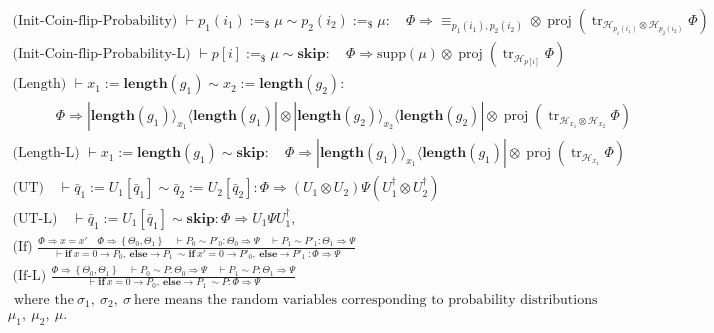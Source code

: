 \documentclass{report}
\theoremstyle{defn_style}
\begin{document}

$\begin{aligned}
& \text{ ({Init-Coin-flip-Probability}) } {\vdash {p_1(i_1):=_\$\mu \sim p_2(i_2):=_\$\mu:\quad \Phi \Longrightarrow \equiv_{p_1(i_1),p_2(i_2)}\otimes\operatorname{proj}\left(\operatorname{tr}_{\mathcal{H}_{p_1(i_1)} \otimes \mathcal{H}_{p_2(i_2)}}\Phi\right)}} \\ 
& \text{ ({Init-Coin-flip-Probability-L}) } {\vdash p[i]:=_\$\mu \sim \textbf{skip}:\quad \Phi \Longrightarrow \text{supp}(\mu)\otimes\operatorname{proj}\left(\operatorname{tr}_{\mathcal{H}_{p[i]} }\Phi\right)} \\ 
&\text{ (Length) } \vdash x_1:=\textbf{length}(g_1) \sim x_2:=\textbf{length}(g_2):\\
&~~~~~~~~~~~\quad \Phi \Longrightarrow  |\textbf{length}(g_1)\rangle_{x_1}\langle \textbf{length}(g_1)| \otimes|\textbf{length}(g_2)\rangle_{x_2}\langle \textbf{length}(g_2)| \otimes \operatorname{proj}\left(\operatorname{tr}_{\mathcal{H}_{x_1} \otimes \mathcal{H}_{x_2}}\Phi\right) \\ 
& \text { (Length-L) } 
\vdash x_1:=\textbf{length}(g_1) \sim \textbf{skip}: \quad \Phi \Longrightarrow  |\textbf{length}(g_1)\rangle_{x_1}\langle \textbf{length}(g_1)| \otimes \operatorname{proj}\left(\operatorname{tr}_{\mathcal{H}_{x_1} }\Phi\right)\\
& \text { (UT)} \quad \vdash \bar{q}_1:=U_1\left[\bar{q}_1\right] \sim \bar{q}_2:=U_2\left[\bar{q}_2\right]: \Phi \Longrightarrow \left(U_1 \otimes U_2\right) \Psi\left(U_1^{\dagger} \otimes U_2^{\dagger}\right)\\
& \text { (UT-L)} \quad \vdash \bar{q}_1:=U_1\left[\bar{q}_1\right] \sim \textbf{skip}: \Phi \Longrightarrow  U_1 \Psi U_1^{\dagger},\\
& \text { ({If}) } \frac{\Phi\Longrightarrow x=x' \quad  \Phi\Longrightarrow\left\{\Theta_0,\Theta_1\right\} \quad \vdash P_{0} \sim P'_{0}: \Theta_0 \Longrightarrow \Psi\quad \vdash P_{1} \sim P'_{1}: \Theta_1 \Longrightarrow \Psi}{\vdash \mathbf{if}~ x=0 \rightarrow P_{0},~\textbf{else}\rightarrow P_{1}~\sim \mathbf{if}~ x'=0 \rightarrow P'_{0},~\textbf{else}\rightarrow P'_{1}~: \Phi \Longrightarrow \Psi}\\ 
& \text { ({If-L}) } \frac{ \Phi\Longrightarrow\left\{\Theta_0,\Theta_1\right\} \quad \vdash P_{0} \sim P: \Theta_0 \Longrightarrow \Psi\quad \vdash P_{1} \sim P: \Theta_1 \Longrightarrow \Psi}{\vdash \mathbf{if }~x=0 \rightarrow P_{0},~\textbf{else}\rightarrow P_1 ~ \sim P: \Phi \Longrightarrow \Psi}\\ 
&~~\text{where the}~\sigma_1,~\sigma_2,~\sigma~\text{here means the random variables corresponding to probability distributions}\\
&\mu_1,~\mu_2,~\mu.
\end{aligned}$
\end{document}
